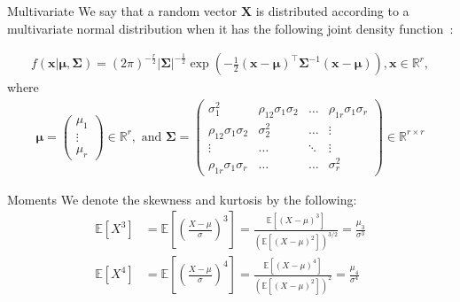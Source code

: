 \documentclass[10pt]{beamer}
\numberwithin{equation}{section}
\begin{document}
    \begin{frame}{Multivariate}
        We say that a random vector $\bm{X}$
        is distributed according to a multivariate normal distribution
        when it has the following joint density function~\autocite[p. 59]{izenman_modern_2008}:

        \begin{definition}
            \begin{align}
                f(\bm{x}| \bm{\mu}, \bm{\Sigma})
                = (2\pi)^{-\frac{r}{2}}
                \left|\bm{\Sigma}\right|^{-\frac{1}{2}}
                \exp\left(-\frac{1}{2}(\bm{x}-\bm{\mu})^\top \bm{\Sigma}^{-1} (\bm{x}-\bm{\mu})\right),
                \bm{x} \in \mathbb{R}^r,
            \end{align}
            where
            \begin{align}
                \bm{\mu} =
                \begin{pmatrix}
                    \mu_1  \\
                    \vdots \\
                    \mu_r
                \end{pmatrix}
                \in \mathbb{R}^r,
                \text{ and }
                \bm{\Sigma} =
                \begin{pmatrix}
                    \sigma_1^2                & \rho_{12}\sigma_1\sigma_2 & \ldots & \rho_{1r}\sigma_1\sigma_r \\
                    \rho_{12}\sigma_1\sigma_2 & \sigma_2^2                & \ldots & \vdots                    \\
                    \vdots                    & \ldots                    & \ddots & \vdots                    \\
                    \rho_{1r}\sigma_1\sigma_r & \ldots                    & \ldots & \sigma_r^2
                \end{pmatrix}
                \in \mathbb{R}^{r\times r}
            \end{align}
        \end{definition}
    \end{frame}

    \begin{frame}{Moments}
        We denote the skewness and kurtosis by the following:
        \begin{align}
            \mathbb{E}[X^3]
            &= \mathbb{E}\left[\left(\frac{X-\mu}{\sigma}\right)^3\right]
            = \frac{\mathbb{E}[(X-\mu)^3]}{(\mathbb{E}[(X-\mu)^2])^{3/2}}
            = \frac{\mu_3}{\sigma^3} \\
            \mathbb{E}[X^4]
            &= \mathbb{E}\left[\left(\frac{X-\mu}{\sigma}\right)^4\right]
            = \frac{\mathbb{E}[(X-\mu)^4]}{(\mathbb{E}[(X-\mu)^2])^2}
            = \frac{\mu_4}{\sigma^4}
        \end{align}
    \end{frame}
\end{document}
